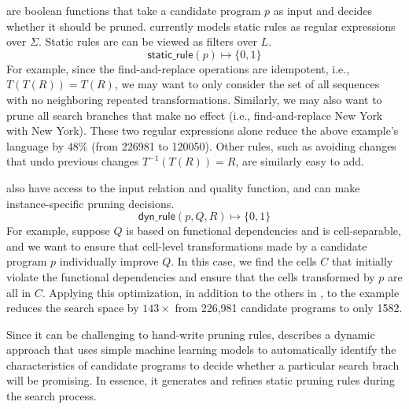 

 are boolean functions that take a candidate program $p$ as input and decides whether it should be pruned. \sys currently models static rules as regular expressions over $\Sigma$.  Static rules are can be viewed as filters over $L$.
\[\textsf{static\_rule}(p) \mapsto \{0,1\}\]
For example, since the find-and-replace operations are idempotent, i.e., $T(T(R)) = T(R)$, we may want to only consider the set of all sequences with no neighboring repeated transformations. Similarly, we may also want to prune all search branches that make no effect (i.e., find-and-replace New York with New York).
These two regular expressions alone reduce the above example's language by $48\%$ (from 226981 to 120050).
Other rules, such as avoiding changes that undo previous changes $T^{-1}(T(R)) = R$, are similarly easy to add.


 also have access to the input relation and quality function, and can make instance-specific pruning decisions.
\[\textsf{dyn\_rule}(p, Q, R) \mapsto \{0,1\}\]
For example, suppose  $Q$ is based on functional dependencies and is cell-separable, and we want to ensure that cell-level transformations made by a candidate program $p$ individually improve $Q$.  In this case, we find the cells $C$ that initially violate the functional dependencies and ensure that the cells transformed by $p$ are all in $C$.  Applying this optimization, in addition to the others in \sys, to the example reduces the search space by $143\times$ from 226,981 candidate programs to only 1582.  

Since it can be challenging to hand-write pruning rules,  describes a dynamic approach that uses simple machine learning models to automatically identify the characteristics of candidate programs to decide whether a particular search brach will be promising.  In essence, it generates and refines static pruning rules during the search process.  

